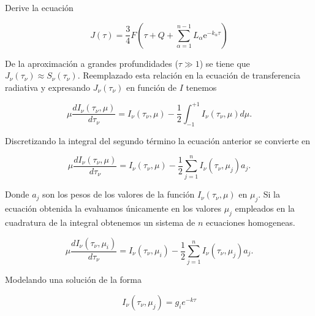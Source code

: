 \documentclass[10pt,spanish,a4paper]{practice}
\begin{document}
    \begin{problem}
        Derive la ecuación

        $$
            J\left(\tau\right) = \frac{3}{4}F\left(\tau + Q + \sum_{\alpha=1}^{n-1}L_{\alpha}\mathrm{e}^{-k_{\alpha}\tau}\right)
        $$

        \begin{solution}
            De la aproximación a grandes profundidades ($\tau \gg 1$) se tiene que $J_\nu\left(\tau_\nu\right) \approx S_\nu\left(\tau_\nu\right)$. Reemplazado esta relación en la ecuación de transferencia radiativa y expresando $J_\nu\left(\tau_\nu\right)$ en función de $I$ tenemos

            \begin{equation*}
                \mu\frac{d I_{\nu}\left(\tau_{\nu}, \mu\right)}{d \tau_{\nu}} = I_{\nu}\left(\tau_{\nu}, \mu\right) - \frac{1}{2}\int_{-1}^{+1}I_{\nu}\left(\tau_{\nu}, \mu\right)d\mu.
            \end{equation*}

            Discretizando la integral del segundo término la ecuación anterior se convierte en

            \begin{equation*}
                \mu\frac{d I_{\nu}\left(\tau_{\nu}, \mu\right)}{d \tau_{\nu}} = I_{\nu}\left(\tau_{\nu}, \mu\right) - \frac{1}{2}\sum_{j=1}^{n}I_{\nu}\left(\tau_{\nu}, \mu_j\right)a_j.
            \end{equation*}

            Donde $a_j$ son los pesos de los valores de la función $I_{\nu}\left(\tau_{\nu}, \mu\right)$ en $\mu_j$. Si la ecuación obtenida la evaluamos únicamente en los valores $\mu_j$ empleados en la cuadratura de la integral obtenemos un sistema de $n$ ecuaciones homogeneas.

            \begin{equation*}
                \mu\frac{d I_{\nu}\left(\tau_{\nu}, \mu_i\right)}{d \tau_{\nu}} = I_{\nu}\left(\tau_{\nu}, \mu_i\right) - \frac{1}{2}\sum_{j=1}^{n}I_{\nu}\left(\tau_{\nu}, \mu_j\right)a_j.
            \end{equation*}

            Modelando una solución de la forma

            \begin{equation*}
                I_{\nu}\left(\tau_{\nu}, \mu_j\right) =g_i e^{-k\tau}
            \end{equation*}


\end{solution}
\end{problem}
\end{document}
